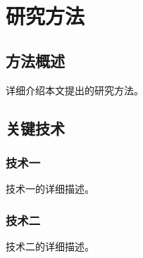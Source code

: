 
\chapter{研究方法}

\section{方法概述}

详细介绍本文提出的研究方法。

\section{关键技术}

\subsection{技术一}

技术一的详细描述。

\subsection{技术二}

技术二的详细描述。
